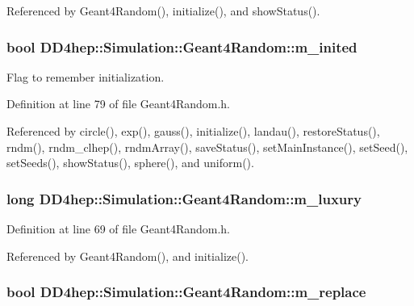 Referenced by Geant4Random(), initialize(), and showStatus().\hypertarget{class_d_d4hep_1_1_simulation_1_1_geant4_random_aa8dd0cf1aa819f72ec19b69b6ae171c5}{
\subsubsection[{m\_\-inited}]{\setlength{\rightskip}{0pt plus 5cm}bool {\bf DD4hep::Simulation::Geant4Random::m\_\-inited}}}
\label{class_d_d4hep_1_1_simulation_1_1_geant4_random_aa8dd0cf1aa819f72ec19b69b6ae171c5}


Flag to remember initialization. 

Definition at line 79 of file Geant4Random.h.

Referenced by circle(), exp(), gauss(), initialize(), landau(), restoreStatus(), rndm(), rndm\_\-clhep(), rndmArray(), saveStatus(), setMainInstance(), setSeed(), setSeeds(), showStatus(), sphere(), and uniform().\hypertarget{class_d_d4hep_1_1_simulation_1_1_geant4_random_aa74af649720c65fd7e4e9d357e77c01d}{
\subsubsection[{m\_\-luxury}]{\setlength{\rightskip}{0pt plus 5cm}long {\bf DD4hep::Simulation::Geant4Random::m\_\-luxury}}}
\label{class_d_d4hep_1_1_simulation_1_1_geant4_random_aa74af649720c65fd7e4e9d357e77c01d}


Definition at line 69 of file Geant4Random.h.

Referenced by Geant4Random(), and initialize().\hypertarget{class_d_d4hep_1_1_simulation_1_1_geant4_random_a3d14b4420a812cdb4e0965f77e3f5988}{
\subsubsection[{m\_\-replace}]{\setlength{\rightskip}{0pt plus 5cm}bool {\bf DD4hep::Simulation::Geant4Random::m\_\-replace}}}
\label{class_d_d4hep_1_1_simulation_1_1_geant4_random_a3d14b4420a812cdb4e0965f77e3f5988}


